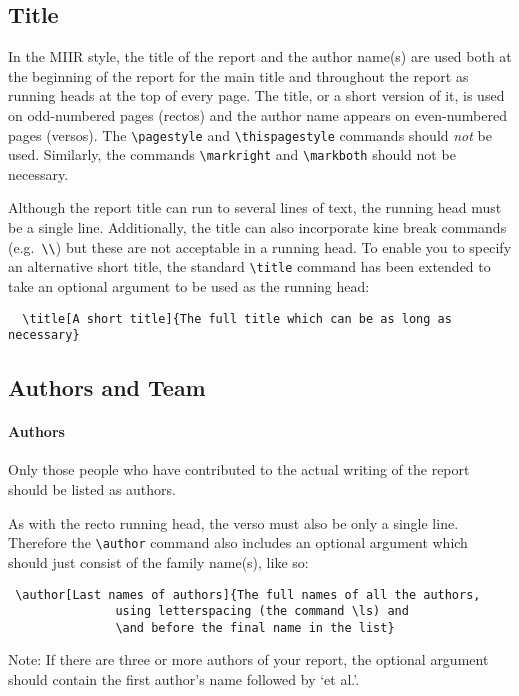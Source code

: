 \documentclass{MIIR}
\newcommand\eg{e.g.\ }
\theoremstyle{plain}
\theoremstyle{definition}
\begin{document}
\subsection{Title}
In the MIIR style, the title of the report and the author name(s)
are used both at the beginning of the report for the main title and
throughout the report as running heads at the top of every page.
The title, or a short version of it, is used on odd-numbered pages (rectos) and the author name
appears on even-numbered pages
(versos). The \verb"\pagestyle" and \verb"\thispagestyle" commands should
\emph{not} be used.  Similarly, the commands \verb"\markright" and
\verb"\markboth" should not be necessary.

Although the report title can run to several lines of text,
the running head must be a single line.
Additionally, the title can also incorporate kine break commands
(\eg \verb"\\") but these are not acceptable in a running head.
To enable you to specify an alternative short title, the
standard \verb"\title" 
 command has been extended to take
an optional argument to be used as the running head:
%
\begin{verbatim}
  \title[A short title]{The full title which can be as long as necessary}
\end{verbatim}


\subsection{Authors and Team}\label{authors}

\paragraph{Authors}
Only those people who have contributed to the actual writing of the report should be listed as authors. 

As with the recto running head, the verso must also be only a single line. Therefore the \verb"\author" command also includes an optional argument which should just consist of the family name(s), like so:

\begin{verbatim}
 \author[Last names of authors]{The full names of all the authors, 
               using letterspacing (the command \ls) and  
               \and before the final name in the list}
\end{verbatim}


Note: If there are three or more authors of your report, the optional argument should contain the first author's name followed by `et al.'.
\end{document}
